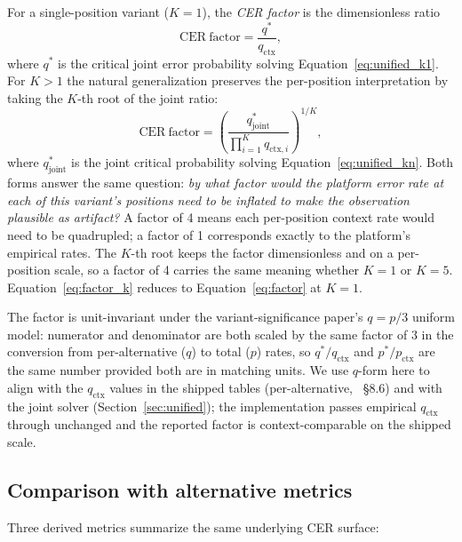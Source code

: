 \documentclass[11pt]{article}
\begin{document}
For a single-position variant ($K = 1$), the \emph{CER factor} is the
dimensionless ratio
\begin{equation}
\label{eq:factor}
\mathrm{CER\ factor} = \frac{q^*}{q_\text{ctx}},
\end{equation}
where $q^*$ is the critical joint error probability solving
Equation~\ref{eq:unified_k1}. For $K > 1$ the natural generalization preserves
the per-position interpretation by taking the $K$-th root of the joint ratio:
\begin{equation}
\label{eq:factor_k}
\mathrm{CER\ factor} = \left( \frac{q^*_\text{joint}}{\prod_{i=1}^{K} q_{\text{ctx},i}} \right)^{\!\!1/K},
\end{equation}
where $q^*_\text{joint}$ is the joint critical probability solving
Equation~\ref{eq:unified_kn}. Both forms answer the same question:
\emph{by what factor would the platform error rate at each of this variant's
positions need to be inflated to make the observation plausible as artifact?}
A factor of 4 means each per-position context rate would need to be
quadrupled; a factor of 1 corresponds exactly to the platform's empirical
rates. The $K$-th root keeps the factor dimensionless and on a per-position
scale, so a factor of 4 carries the same meaning whether $K = 1$ or $K = 5$.
Equation~\ref{eq:factor_k} reduces to Equation~\ref{eq:factor} at $K = 1$.

The factor is unit-invariant under the variant-significance paper's
$q = p/3$ uniform model: numerator and denominator are both scaled by the
same factor of 3 in the conversion from per-alternative ($q$) to total
($p$) rates, so $q^*/q_\text{ctx}$ and $p^*/p_\text{ctx}$ are the same
number provided both are in matching units. We use $q$-form here to align
with the $q_\text{ctx}$ values in the shipped tables (per-alternative,
\cite{hp_paper}~\S 8.6) and with the joint solver
(Section~\ref{sec:unified}); the implementation passes empirical
$q_\text{ctx}$ through unchanged and the reported factor is
context-comparable on the shipped scale.

\subsection{Comparison with alternative metrics}

Three derived metrics summarize the same underlying CER surface:
\end{document}
